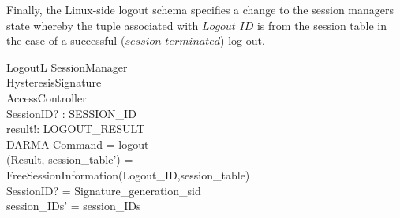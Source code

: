 \documentclass[a4paper,pdftex]{article}
\begin{document}
Finally, the Linux-side logout schema  specifies a 
change to the
session managers state whereby  the tuple associated
with $Logout\_ID$ is from the session table  in the case
of a successful ($session\_terminated$) log out.

\begin{schema}{LogoutL}
  \Delta SessionManager    \\
  \Xi HysteresisSignature \\
  \Xi AccessController    \\
  SessionID? : SESSION\_ID \\
  result!: LOGOUT\_RESULT  \\
  DARMA
  \where
  Command = logout \\
  (Result, session\_table') = \\
  FreeSessionInformation(Logout\_ID,session\_table) \\
  SessionID?  = Signature\_generation\_sid \\
  session\_IDs' = session\_IDs
\end{schema}
\end{document}
